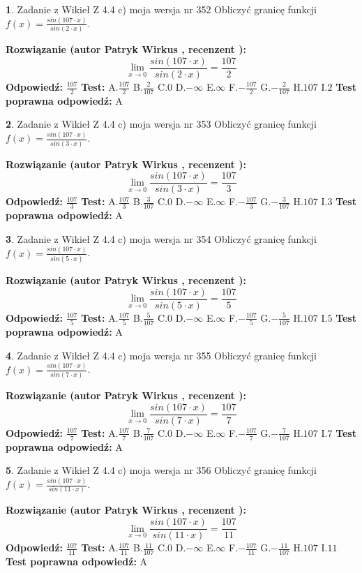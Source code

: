 \documentclass[12pt, a4paper]{article}
\theoremstyle{definition} %
\newtheorem{zad}{}
\newcommand{\zadStart}[1]{\begin{zad}#1\newline}
\newcommand{\zadStop}{\end{zad}}
\newcommand{\rozwStart}[2]{\noindent \textbf{Rozwiązanie (autor #1 , recenzent #2): }\newline}
\newcommand{\rozwStop}{\newline}
\newcommand{\odpStart}{\noindent \textbf{Odpowiedź:}\newline}
\newcommand{\odpStop}{\newline}
\newcommand{\testStart}{\noindent \textbf{Test:}\newline}
\newcommand{\testStop}{\newline}
\newcommand{\kluczStart}{\noindent \textbf{Test poprawna odpowiedź:}\newline}
\newcommand{\kluczStop}{\newline}
\begin{document}
\zadStart{Zadanie z Wikieł Z 4.4 c) moja wersja nr 352}
Obliczyć granicę funkcji $f(x)=\frac{sin(107\cdot x)}{sin(2\cdot x)}$.
\zadStop
\rozwStart{Patryk Wirkus}{}
$$\lim\limits_{x\to 0}\frac{sin(107\cdot x)}{sin(2\cdot x)}=
\frac{107}{2}$$
\rozwStop
\odpStart
$\frac{107}{2}$
\odpStop
\testStart
A.$\frac{107}{2}$
B.$\frac{2}{107}$
C.$0$
D.$-\infty$
E.$\infty$
F.$-\frac{107}{2}$
G.$-\frac{2}{107}$
H.$107$
I.$2$
\testStop
\kluczStart
A
\kluczStop



\zadStart{Zadanie z Wikieł Z 4.4 c) moja wersja nr 353}
Obliczyć granicę funkcji $f(x)=\frac{sin(107\cdot x)}{sin(3\cdot x)}$.
\zadStop
\rozwStart{Patryk Wirkus}{}
$$\lim\limits_{x\to 0}\frac{sin(107\cdot x)}{sin(3\cdot x)}=
\frac{107}{3}$$
\rozwStop
\odpStart
$\frac{107}{3}$
\odpStop
\testStart
A.$\frac{107}{3}$
B.$\frac{3}{107}$
C.$0$
D.$-\infty$
E.$\infty$
F.$-\frac{107}{3}$
G.$-\frac{3}{107}$
H.$107$
I.$3$
\testStop
\kluczStart
A
\kluczStop



\zadStart{Zadanie z Wikieł Z 4.4 c) moja wersja nr 354}
Obliczyć granicę funkcji $f(x)=\frac{sin(107\cdot x)}{sin(5\cdot x)}$.
\zadStop
\rozwStart{Patryk Wirkus}{}
$$\lim\limits_{x\to 0}\frac{sin(107\cdot x)}{sin(5\cdot x)}=
\frac{107}{5}$$
\rozwStop
\odpStart
$\frac{107}{5}$
\odpStop
\testStart
A.$\frac{107}{5}$
B.$\frac{5}{107}$
C.$0$
D.$-\infty$
E.$\infty$
F.$-\frac{107}{5}$
G.$-\frac{5}{107}$
H.$107$
I.$5$
\testStop
\kluczStart
A
\kluczStop



\zadStart{Zadanie z Wikieł Z 4.4 c) moja wersja nr 355}
Obliczyć granicę funkcji $f(x)=\frac{sin(107\cdot x)}{sin(7\cdot x)}$.
\zadStop
\rozwStart{Patryk Wirkus}{}
$$\lim\limits_{x\to 0}\frac{sin(107\cdot x)}{sin(7\cdot x)}=
\frac{107}{7}$$
\rozwStop
\odpStart
$\frac{107}{7}$
\odpStop
\testStart
A.$\frac{107}{7}$
B.$\frac{7}{107}$
C.$0$
D.$-\infty$
E.$\infty$
F.$-\frac{107}{7}$
G.$-\frac{7}{107}$
H.$107$
I.$7$
\testStop
\kluczStart
A
\kluczStop



\zadStart{Zadanie z Wikieł Z 4.4 c) moja wersja nr 356}
Obliczyć granicę funkcji $f(x)=\frac{sin(107\cdot x)}{sin(11\cdot x)}$.
\zadStop
\rozwStart{Patryk Wirkus}{}
$$\lim\limits_{x\to 0}\frac{sin(107\cdot x)}{sin(11\cdot x)}=
\frac{107}{11}$$
\rozwStop
\odpStart
$\frac{107}{11}$
\odpStop
\testStart
A.$\frac{107}{11}$
B.$\frac{11}{107}$
C.$0$
D.$-\infty$
E.$\infty$
F.$-\frac{107}{11}$
G.$-\frac{11}{107}$
H.$107$
I.$11$
\testStop
\kluczStart
A
\kluczStop
\end{document}
